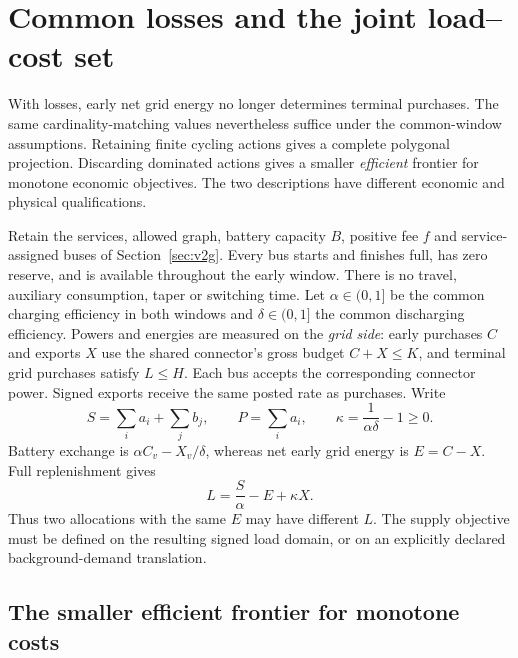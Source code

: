 \section{Common losses and the joint load--cost set}
\label{sec:lossy}
With losses, early net grid energy no longer determines terminal purchases.
The same cardinality-matching values nevertheless suffice under the
common-window assumptions. Retaining finite cycling actions gives a complete
polygonal projection. Discarding dominated actions gives a smaller
\emph{efficient} frontier for monotone economic objectives. The two
descriptions have different economic and physical qualifications.

Retain the services, allowed graph, battery capacity $B$, positive fee $f$
and service-assigned buses of Section~\ref{sec:v2g}. Every bus starts and
finishes full, has zero reserve, and is available throughout the early
window. There is no travel, auxiliary consumption, taper or switching time.
Let $\alpha\in(0,1]$ be the common charging efficiency in both windows
and $\delta\in(0,1]$ the common discharging efficiency. Powers and energies
are measured on the \emph{grid side}: early purchases $C$ and exports $X$
use the shared connector's gross budget $C+X\le K$, and terminal grid
purchases satisfy $L\le H$. Each bus accepts the corresponding connector
power. Signed exports receive the same posted rate as purchases.
Write
\[
 S=\sum_i a_i+\sum_j b_j,\qquad P=\sum_i a_i,\qquad
 \kappa=\frac{1}{\alpha\delta}-1\ge0.
\]
Battery exchange is $\alpha C_v-X_v/\delta$, whereas net early grid
energy is $E=C-X$. Full replenishment gives
\begin{equation}\label{eq:lossyaccounting}
 L=\frac S\alpha-E+\kappa X.
\end{equation}
Thus two allocations with the same $E$ may have different $L$.
The supply objective must be defined on the resulting signed load domain,
or on an explicitly declared background-demand translation.



\subsection{The smaller efficient frontier for monotone costs}


